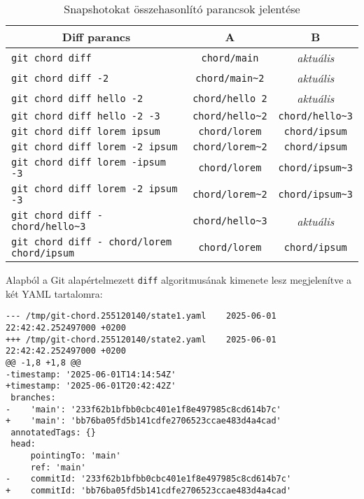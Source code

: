 \documentclass[
]{elteikthesis}[2025/03/25]
\begin{document}
\begin{table}[h]
\captionsetup{justification=justified, singlelinecheck=false}
\begin{center}
\begin{tabular}{|l|c|c|} 
 \hline
 \multicolumn{1}{|c}{\textbf{Diff parancs}} &
 \multicolumn{1}{|c}{\textbf{A}} &
 \multicolumn{1}{|c|}{\textbf{B}} \\
 \hline\hline
 
 \texttt{git chord diff} & \texttt{chord/main} & \textit{aktuális} \\
 \texttt{git chord diff -2} & \texttt{chord/main\~{}2} & \textit{aktuális} \\
 \texttt{git chord diff hello -2} & \texttt{chord/hello~{}2} & \textit{aktuális} \\
 \texttt{git chord diff hello -2 -3} & \texttt{chord/hello\~{}2} & \texttt{chord/hello\~{}3} \\
 \texttt{git chord diff lorem ipsum} & \texttt{chord/lorem} & \texttt{chord/ipsum} \\
 \texttt{git chord diff lorem -2 ipsum} & \texttt{chord/lorem\~{}2} & \texttt{chord/ipsum} \\
 \texttt{git chord diff lorem -ipsum -3} & \texttt{chord/lorem} & \texttt{chord/ipsum\~{}3} \\
 \texttt{git chord diff lorem -2 ipsum -3} & \texttt{chord/lorem\~{}2} & \texttt{chord/ipsum\~{}3} \\
 \texttt{git chord diff - chord/hello\~{}3} & \texttt{chord/hello\~{}3} & \textit{aktuális} \\
 \texttt{git chord diff - chord/lorem chord/ipsum} & \texttt{chord/lorem} & \texttt{chord/ipsum} \\
 
 \hline
 
\end{tabular}
\end{center}
\caption{Snapshotokat összehasonlító parancsok jelentése}
\label{tab:diff-commands}
\end{table}

Alapból a Git alapértelmezett \verb|diff| algoritmusának kimenete lesz megjelenítve a két YAML tartalomra:

\begin{verbatim}
--- /tmp/git-chord.255120140/state1.yaml	2025-06-01 22:42:42.252497000 +0200
+++ /tmp/git-chord.255120140/state2.yaml	2025-06-01 22:42:42.252497000 +0200
@@ -1,8 +1,8 @@
-timestamp: '2025-06-01T14:14:54Z'
+timestamp: '2025-06-01T20:42:42Z'
 branches:
-    'main': '233f62b1bfbb0cbc401e1f8e497985c8cd614b7c'
+    'main': 'bb76ba05fd5b141cdfe2706523ccae483d4a4cad'
 annotatedTags: {}
 head:
     pointingTo: 'main'
     ref: 'main'
-    commitId: '233f62b1bfbb0cbc401e1f8e497985c8cd614b7c'
+    commitId: 'bb76ba05fd5b141cdfe2706523ccae483d4a4cad'
\end{verbatim}
\end{document}
